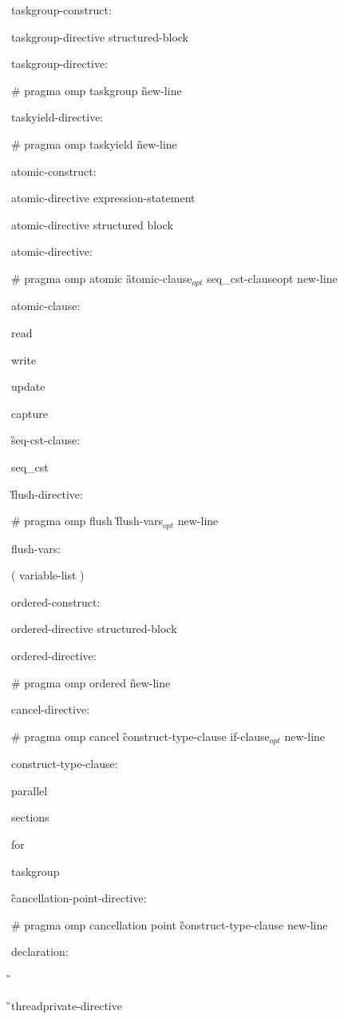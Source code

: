 {taskgroup-construct:

\I taskgroup-directive structured-block

taskgroup-directive:

\C\I \# pragma omp taskgroup \G new-line

taskyield-directive:

\C\I \# pragma omp taskyield \G new-line

atomic-construct:

\I atomic-directive expression-statement

\I atomic-directive structured block

atomic-directive:

\C\I \# pragma omp atomic \G atomic-clause$_{opt}$ seq\_cst-clauseopt new-line

atomic-clause:

\C\I read

\I write

\I update

\I capture

\G seq-cst-clause:

\C\I seq\_cst

\G flush-directive:

\C\I \# pragma omp flush \G flush-vars$_{opt}$ new-line

flush-vars:

\I ( variable-list )

ordered-construct:

\I ordered-directive structured-block

ordered-directive:

\C\I \# pragma omp ordered \G new-line

cancel-directive:

\C\I \# pragma omp cancel \G construct-type-clause if-clause$_{opt}$ new-line

construct-type-clause:

\C\I parallel

\I sections

\I for

\I taskgroup

\G cancellation-point-directive:

\C\I \# pragma omp cancellation point \G construct-type-clause new-line

declaration:

\G{}

\G\I threadprivate-directive

}
